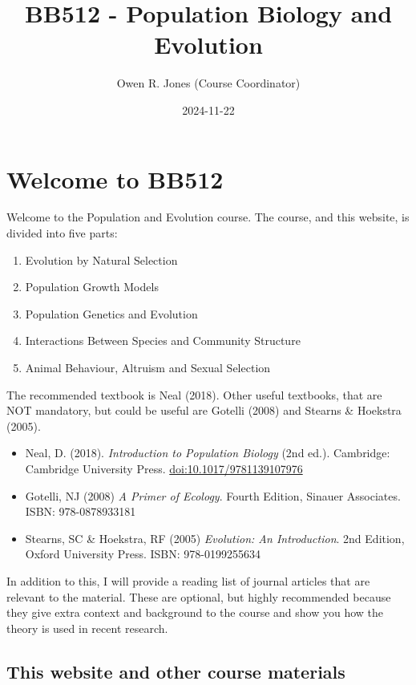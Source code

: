 \documentclass[
  a4paper]{book}
\title{BB512 - Population Biology and Evolution}
\author{Owen R. Jones (Course Coordinator)}
\date{2024-11-22}
\providecommand{\tightlist}{%
  \setlength{\itemsep}{0pt}\setlength{\parskip}{0pt}}
\begin{document}
\maketitle

{
\setcounter{tocdepth}{1}
\tableofcontents
}
\chapter{Welcome to BB512}\label{welcome-to-bb512}

Welcome to the Population and Evolution course.
The course, and this website, is divided into five parts:

\begin{enumerate}
\def\labelenumi{\arabic{enumi}.}
\tightlist
\item
  Evolution by Natural Selection
\item
  Population Growth Models
\item
  Population Genetics and Evolution
\item
  Interactions Between Species and Community Structure
\item
  Animal Behaviour, Altruism and Sexual Selection
\end{enumerate}

The recommended textbook is Neal (2018). Other useful textbooks, that are NOT mandatory, but could be useful are Gotelli (2008) and Stearns \& Hoekstra (2005).

\begin{itemize}
\tightlist
\item
  Neal, D. (2018). \emph{Introduction to Population Biology} (2nd ed.). Cambridge: Cambridge University Press. \url{doi:10.1017/9781139107976}
\item
  Gotelli, NJ (2008) \emph{A Primer of Ecology}. Fourth Edition, Sinauer Associates. ISBN: 978-0878933181
\item
  Stearns, SC \& Hoekstra, RF (2005) \emph{Evolution: An Introduction}. 2nd Edition, Oxford University Press. ISBN: 978-0199255634
\end{itemize}

In addition to this, I will provide a reading list of journal articles that are relevant to the material. These are optional, but highly recommended because they give extra context and background to the course and show you how the theory is used in recent research.

\section{This website and other course materials}\label{this-website-and-other-course-materials}
\end{document}
